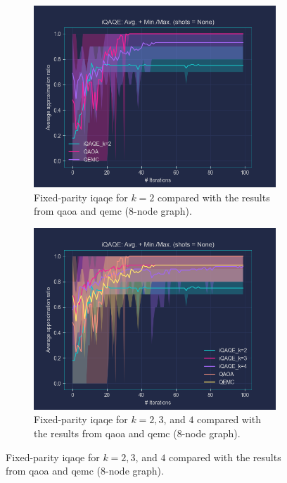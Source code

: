 \begin{figure}[hb!]
  \centering
  \begin{subfigure}[t]{0.495\textwidth}
      \centering
      \includegraphics[width=1\textwidth]{Figures/Chapter_5/Fixed-parity/k=2(8-node).png}
      \caption{Fixed-parity \acrshort{iqaqe} for $k=2$ compared with the results from \acrshort{qaoa} and \acrshort{qemc} ($8$-node graph).}
      \label{fig:Fixed-parity/k=2}
  \end{subfigure}
  \hfill
  \begin{subfigure}[t]{0.495\textwidth}
      \centering
      \includegraphics[width=1\textwidth]{Figures/Chapter_5/Fixed-parity/k=2_3_4(8-node).png}
      \caption{Fixed-parity \acrshort{iqaqe} for $k=2, 3$, and $4$ compared with the results from \acrshort{qaoa} and \acrshort{qemc} ($8$-node graph).}
      \label{fig:Fixed-parity/k=2,3,4}
  \end{subfigure}
\end{figure}

